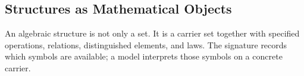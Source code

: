 \subsection{Structures as Mathematical Objects}
\label{subsec:structures-as-mathematical-objects}

\begin{remark*}[Exposition]
An algebraic structure is not only a set.  It is a carrier set together with
specified operations, relations, distinguished elements, and laws.  The
signature records which symbols are available; a model interprets those symbols
on a concrete carrier.
\end{remark*}
